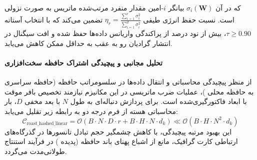 که در آن $\sigma_i(\mathbf{W})$ بیانگر $i$-امین مقدار منفرد مرتب‌شده ماتریس به صورت نزولی است. نسبت حفظ انرژی طیفی $\eta_r = \frac{\sum_{i=1}^r \sigma_i^2}{\sum_{i=1}^{d} \sigma_i^2}$ تضمین می‌کند که با انتخاب آستانه $\tau \ge 0.90$، بیش از نود درصد از پراکندگی واریانس داده‌ها حفظ شده و افت سیگنال در انتشار گرادیان رو به عقب به حداقل ممکن کاهش می‌یابد.

\paragraph{تحلیل مجانبی و پیچیدگی اشتراک حافظه سخت‌افزاری}
از منظر پیچیدگی محاسباتی و انتقال داده‌ها در سلسومراتب حافظه (حافظه سراسری  به حافظه محلی )، عملیات ضرب ماتریسی در این مکانیزم نیازمند تخصیص بافر موقت با ابعاد فاکتورگیری‌شده است. برای پردازش دنباله‌ای به طول $N$ با بعد مخفی $D$، بار محاسباتی هسته از فرم درجه دو به رابطه زیر تقلیل می‌یابد:
\begin{equation}
\label{eq:complexity_roast_hashed_linear}
\mathcal{C}_{\text{roast\_hashed\_linear}} = \mathcal{O}\left( B \cdot N \cdot D \cdot r + B \cdot H \cdot N \cdot d_k \right) \ll \mathcal{O}\left( B \cdot H \cdot N^2 \cdot d_k \right)
\end{equation}
این بهبود مرتبه پیچیدگی، با کاهش چشمگیر حجم تبادل تانسورها در گذرگاه‌های ارتباطی کارت گرافیک، مانع از اشباع پهنای باند حافظه (پدیده ) در فرآیند استنتاج طولانی‌مدت می‌گردد.
